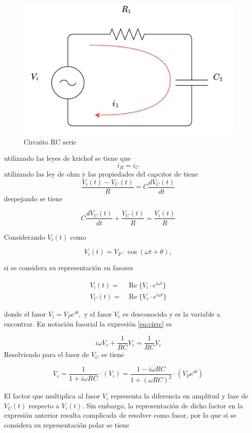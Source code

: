 \documentclass{article}
\begin{document}
\begin{figure}[htbp]
\centering
\includegraphics{images/rcserie.png}
\caption{Circuito RC serie}
\end{figure}

utilizando las leyes de krichof se tiene que \[
i_{R}=i_{C}
\] utilizando las ley de ohm y las propiedades del capcitor de tiene \[
\frac{V_{i}(t)-V_{C}(t)}{R}=C\frac{dV_{C}(t)}{dt}
\] despejando se tiene

\begin{equation}\label{eq:cirrc}
C\frac{dV_{C}(t)}{dt}+\frac{V_{C}(t)}{R}=\frac{V_{i}(t)}{R}
\end{equation}

Considerando $V_{i}(t)$ como

\[
V_i(t) = V_P\cdot \cos(\omega t + \theta),
\]

si se considera su representación en fasores

\begin{align*} 
V_i(t) =& \operatorname{Re} \{V_i \cdot e^{i\omega t}\} \\  
V_C(t) =& \operatorname{Re} \{V_c \cdot e^{i\omega t}\}
\end{align*}

donde el fasor $V_i = V_P e^{i\theta},$ y el fasor $V_c$ es desconocido
y es la variable a encontrar. En notación fasorial la expresión
\eqref{eq:cirrc} es

\[
i \omega V_c + \frac{1}{RC} V_c = \frac{1}{RC}V_i
\] Resolviendo para el fasor de $V_{C}$ se tiene

\[
V_c = \frac{1}{1 + i \omega RC} \cdot (V_i) = \frac{1-i\omega R C}{1+(\omega R C)^2} \cdot (V_P e^{i\theta})
\]

El factor que multiplica al fasor $V_i$ representa la diferencia en
amplitud y fase de $V_C(t)$ respecto a $V_{i}(t)$. Sin embargo, la
representación de dicho factor en la expresión anterior resulta
complicada de resolver como fasor, por lo que si se considera su
representación polar se tiene
\end{document}
